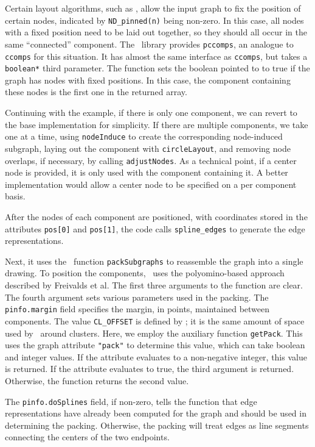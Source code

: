 Certain layout algorithms, such as \neato, allow the input graph to
fix the position of certain nodes, indicated by {\tt ND\_pinned(n)} being
non-zero. In this case, all nodes with a
fixed position need to be laid out together, so they should all
occur in the same ``connected'' component. The \pack\ library 
provides {\tt pccomps}, an analogue to {\tt ccomps} for this
situation. It has almost the same interface as {\tt ccomps}, but takes
a {\tt boolean*} third parameter. The function sets the boolean pointed
to to true if the graph has nodes with fixed positions. In this case,
the component containing these nodes is the first one in the returned array.

Continuing with the example,
if there is only one component, we can revert to the base implementation
for simplicity. If there are multiple components, 
we take one at a time, using {\tt nodeInduce} to create the 
corresponding node-induced subgraph, laying out the component with
{\tt circleLayout}, and removing node overlaps, if necessary, by
calling {\tt adjustNodes}. As a technical point, if a center node
is provided, it is only used with the component containing it. A
better implementation would allow a center node to be specified on
a per component basis.

After the nodes of each component are positioned, with coordinates
stored in the attributes {\tt pos[0]} and {\tt pos[1]}, the code
calls {\tt spline\_edges} to generate the edge representations. 

Next, it uses the \pack\ function {\tt packSubgraphs} to reassemble
the graph into a single drawing. To position the components, \pack\
uses the polyomino-based approach described by
Freivalds et al\cite{pack}. The first three arguments to the
function are clear. The fourth argument sets various parameters
used in the packing. The {\tt pinfo.margin} field specifies the
margin, in points, maintained between components. The value
{\tt CL\_OFFSET} is defined by \gviz; it is the same amount of
space used by \dot\ around clusters. Here, we employ the auxiliary
function {\tt getPack}. This uses the graph attribute {\tt "pack"} to
determine this value, which can take boolean and integer values.
If the attribute evaluates to a non-negative integer, this value is
returned. If the attribute evaluates to true, the third argument is
returned. Otherwise, the function returns the second value.

The {\tt pinfo.doSplines} field, if non-zero,
tells the function that edge representations have already been
computed for the graph and should be used in determining the packing.
Otherwise, the packing will treat edges as line segments connecting
the centers of the two endpoints.

